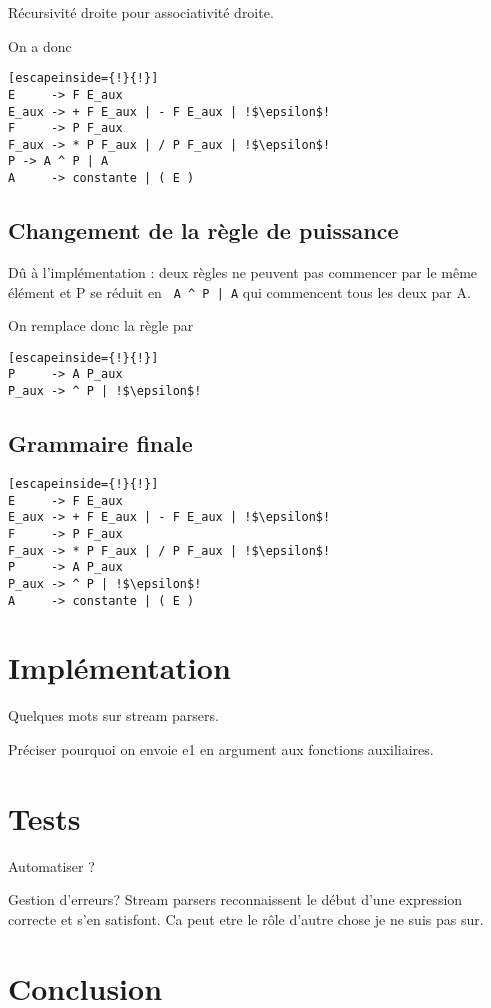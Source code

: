 \documentclass[12pt]{article}
\begin{document}
Récursivité droite pour associativité droite.

On a donc 
\begin{lstlisting}[escapeinside={!}{!}]
E     -> F E_aux
E_aux -> + F E_aux | - F E_aux | !$\epsilon$!
F     -> P F_aux
F_aux -> * P F_aux | / P F_aux | !$\epsilon$!
P -> A ^ P | A
A     -> constante | ( E )
\end{lstlisting}

\subsection{Changement de la règle de puissance}
Dû à l'implémentation : deux règles ne peuvent pas commencer par le même élément et P se réduit en \lstinline{ A ^ P | A} qui commencent tous les deux par A.

On remplace donc la règle par 
\begin{lstlisting}[escapeinside={!}{!}]
P     -> A P_aux
P_aux -> ^ P | !$\epsilon$!
\end{lstlisting}

\subsection{Grammaire finale}
\begin{lstlisting}[escapeinside={!}{!}]
E     -> F E_aux
E_aux -> + F E_aux | - F E_aux | !$\epsilon$!
F     -> P F_aux
F_aux -> * P F_aux | / P F_aux | !$\epsilon$!
P     -> A P_aux
P_aux -> ^ P | !$\epsilon$!
A     -> constante | ( E )
\end{lstlisting}
 

\section{Implémentation}
Quelques mots sur stream parsers.

Préciser pourquoi on envoie e1 en argument aux fonctions auxiliaires.

\section{Tests}
Automatiser ?

Gestion d'erreurs? Stream parsers reconnaissent le début d'une expression correcte et s'en satisfont. Ca peut etre le rôle d'autre chose je ne suis pas sur.

\section{Conclusion}
\end{document}
